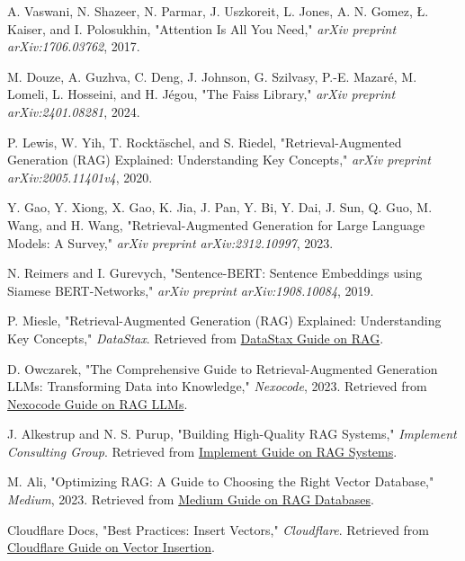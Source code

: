 \documentclass{wseas}
\begin{document}
\begin{thebibliography}{9}

   A. Vaswani, N. Shazeer, N. Parmar, J. Uszkoreit, L. Jones, A. N. Gomez, Ł. Kaiser, and I. Polosukhin, "Attention Is All You Need," \textit{arXiv preprint arXiv:1706.03762}, 2017.
  
   M. Douze, A. Guzhva, C. Deng, J. Johnson, G. Szilvasy, P.-E. Mazaré, M. Lomeli, L. Hosseini, and H. Jégou, "The Faiss Library," \textit{arXiv preprint arXiv:2401.08281}, 2024.
  
   P. Lewis, W. Yih, T. Rocktäschel, and S. Riedel, "Retrieval-Augmented Generation (RAG) Explained: Understanding Key Concepts," \textit{arXiv preprint arXiv:2005.11401v4}, 2020.
  
   Y. Gao, Y. Xiong, X. Gao, K. Jia, J. Pan, Y. Bi, Y. Dai, J. Sun, Q. Guo, M. Wang, and H. Wang, "Retrieval-Augmented Generation for Large Language Models: A Survey," \textit{arXiv preprint arXiv:2312.10997}, 2023.
  
   N. Reimers and I. Gurevych, "Sentence-BERT: Sentence Embeddings using Siamese BERT-Networks," \textit{arXiv preprint arXiv:1908.10084}, 2019.
  
   P. Miesle, "Retrieval-Augmented Generation (RAG) Explained: Understanding Key Concepts," \textit{DataStax}. Retrieved from \href{https://www.datastax.com/guides/what-is-retrieval-augmented-generation}{DataStax Guide on RAG}.
  
   D. Owczarek, "The Comprehensive Guide to Retrieval-Augmented Generation LLMs: Transforming Data into Knowledge," \textit{Nexocode}, 2023. Retrieved from \href{https://nexocode.com/blog/posts/retrieval-augmented-generation-rag-llms}{Nexocode Guide on RAG LLMs}.
  
   J. Alkestrup and N. S. Purup, "Building High-Quality RAG Systems," \textit{Implement Consulting Group}. Retrieved from \href{https://implementconsultinggroup.com/article/building-high-quality-rag-systems}{Implement Guide on RAG Systems}.
  
   M. Ali, "Optimizing RAG: A Guide to Choosing the Right Vector Database," \textit{Medium}, 2023. Retrieved from \href{https://medium.com/@mutahar789/optimizing-rag-a-guide-to-choosing-the-right-vector-database-480f71a33139}{Medium Guide on RAG Databases}.
  
   Cloudflare Docs, "Best Practices: Insert Vectors," \textit{Cloudflare}. Retrieved from \href{https://developers.cloudflare.com/vectorize/best-practices/insert-vectors/}{Cloudflare Guide on Vector Insertion}.
  

\end{thebibliography}
\end{document}
